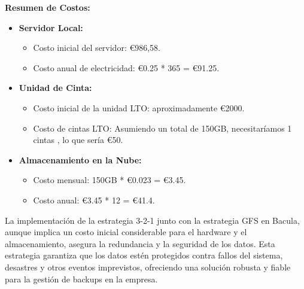 \textbf{Resumen de Costos:}
\begin{itemize}
    \item \textbf{Servidor Local:}
    \begin{itemize}
        \item Costo inicial del servidor: €986,58.
        \item Costo anual de electricidad: €0.25 * 365 = €91.25.
    \end{itemize}
    \item \textbf{Unidad de Cinta:}
    \begin{itemize}
        \item Costo inicial de la unidad LTO: aproximadamente €2000.
        \item Costo de cintas LTO: Asumiendo un total de 150GB, necesitaríamos 1 cintas , lo que sería  €50.
    \end{itemize}
    \item \textbf{Almacenamiento en la Nube:}
    \begin{itemize}
        \item Costo mensual: 150GB * €0.023 = €3.45.
        \item Costo anual: €3.45 * 12 = €41.4.
    \end{itemize}
\end{itemize}

La implementación de la estrategia 3-2-1 junto con la estrategia GFS en Bacula, aunque implica un costo inicial considerable para el hardware y el almacenamiento, asegura la redundancia y la seguridad de los datos. Esta estrategia garantiza que los datos estén protegidos contra fallos del sistema, desastres y otros eventos imprevistos, ofreciendo una solución robusta y fiable para la gestión de backups en la empresa.








